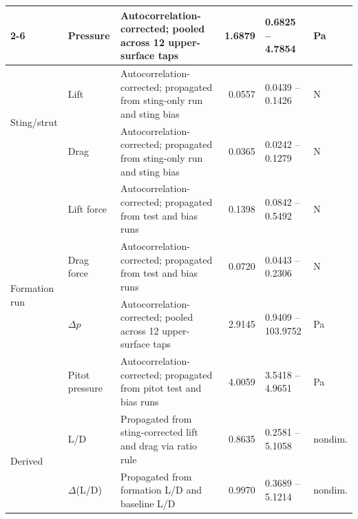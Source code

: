 \begin{longtable}{l p{1.8cm} p{4.0cm} r p{1.8cm} l}
        \cline{2-6}
         & Pressure & Autocorrelation-corrected; pooled across 12 upper-surface taps & 1.6879 & 0.6825 -- 4.7854 & Pa \\
        \hline
        \multirow{2}{*}{Sting/strut} & Lift & Autocorrelation-corrected; propagated from sting-only run and sting bias & 0.0557 & 0.0439 -- 0.1426 & N \\
        \cline{2-6}
         & Drag & Autocorrelation-corrected; propagated from sting-only run and sting bias & 0.0365 & 0.0242 -- 0.1279 & N \\
        \hline
        \multirow{4}{*}{Formation run} & Lift force & Autocorrelation-corrected; propagated from test and bias runs & 0.1398 & 0.0842 -- 0.5492 & N \\
        \cline{2-6}
         & Drag force & Autocorrelation-corrected; propagated from test and bias runs & 0.0720 & 0.0443 -- 0.2306 & N \\
        \cline{2-6}
         & $\Delta p$ & Autocorrelation-corrected; pooled across 12 upper-surface taps & 2.9145 & 0.9409 -- 103.9752 & Pa \\
        \cline{2-6}
         & Pitot pressure & Autocorrelation-corrected; propagated from pitot test and bias runs & 4.0059 & 3.5418 -- 4.9651 & Pa \\
        \hline
        \multirow{2}{*}{Derived} & L/D & Propagated from sting-corrected lift and drag via ratio rule & 0.8635 & 0.2581 -- 5.1058 & nondim. \\
        \cline{2-6}
         & $\Delta$(L/D) & Propagated from formation L/D and baseline L/D & 0.9970 & 0.3689 -- 5.1214 & nondim. \\
        \hline
        \end{longtable}
